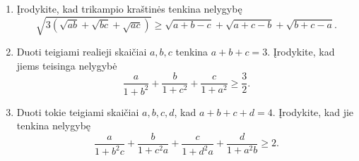 \begin{enumerate}
  \item Įrodykite, kad trikampio kraštinės tenkina nelygybę
    $$\sqrt{3\left(\sqrt{ab}+\sqrt{bc}+\sqrt{ac}\right)}\geq\sqrt{a+b-c}+\sqrt{a+c-b}+\sqrt{b+c-a}.$$
  \item {} Duoti teigiami realieji skaičiai $a,b,c$
    tenkina $a+b+c=3$. Įrodykite, kad jiems teisinga nelygybė
    $$\frac{a}{1+b^2}+\frac{b}{1+c^2}+\frac{c}{1+a^2}\geq\frac{3}{2}.$$
  \item {} Duoti tokie teigiami skaičiai $a,b,c,d$, kad
    $a+b+c+d=4$. Įrodykite, kad jie tenkina nelygybę
    $$\frac{a}{1+b^2c}+\frac{b}{1+c^2a}+\frac{c}{1+d^2a}+\frac{d}{1+a^2b}\geq 2.$$

\end{enumerate}
